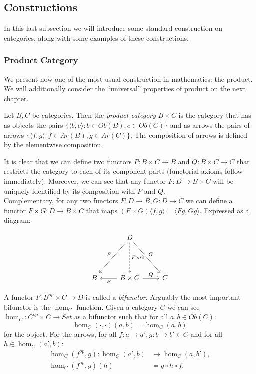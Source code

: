 \subsection{Constructions}
In this last subsection we will introduce some standard construction on categories, along with some examples of these constructions.


\subsubsection{Product Category}
We present now one of the most usual construction in mathematics: the product. We will additionally consider the ``universal'' properties of product on the next chapter. 

\begin{definition}
  Let $B,C$ be categories. Then the \emph{product category} $B\times C$ is the category that has as objects the pairs $\{\langle b,c\rangle : b \in Ob(B), c\in Ob(C)\}$ and as arrows the pairs of arrows $\{\langle f,g\rangle: f \in Ar(B), g\in Ar(C)\}$. The composition of arrows is defined by the elementwise composition. 
\end{definition}

It is clear that we can define two functors $P: B\times C \to B$ and $Q: B \times C \to C$ that restricts the category to each of its component parts (functorial axioms follow immediately). Moreover, we can see that any functor $F:D\to B\times C$ will be uniquely identified by its composition with $P$ and $Q$.\\

Complementary, for any two functors $F:D\to B, G:D\to C$ we can define a functor $F \times G : D \to B\times C$ that maps $(F\times G) \langle f,g\rangle = \langle Fg, Gg\rangle$. Expressed as a diagram: 

\[
  \begin{tikzcd}
    {} & D
    \arrow[swap, "F"]{ddl}
    \arrow[dashed, "F\times G"]{dd}
    \arrow["G"]{ddr}\\
    {} & \\
    B & B \times C
    \arrow["P"]{l}
    \arrow["Q"]{r} & C
  \end{tikzcd}
\]

A functor $F: B^{op}\times C \to D$ is called  a \emph{bifunctor}. Arguably the most important bifunctor is the $\hom_C$ function. Given a category $C$ we can see $\hom_C: C^{op}\times C \to Set$ as a bifunctor such that for all $a,b \in Ob(C)$:
\[
  \hom_C(\cdot,\cdot)(a,b) = \hom_C (a,b) 
\]
for the object. For the arrows, for all $f:a\to a', g:b\to b' \in C$ and for all $h\in \hom_C(a',b)$:
\begin{align*}
  \hom_C(f^{op},g): \hom_C (a',b)  & \to \hom_C(a,b'), \\
  \hom_C(f^{op},g) (h)   &= g \circ h \circ f.
\end{align*}

